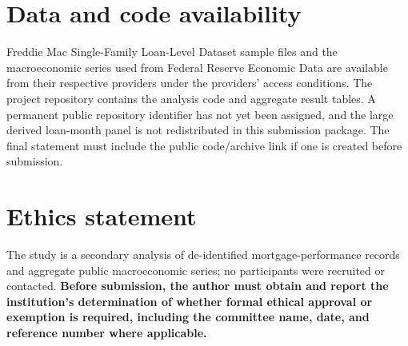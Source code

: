 \section*{Data and code availability}

Freddie Mac Single-Family Loan-Level Dataset sample files and the macroeconomic series used from Federal Reserve Economic Data are available from their respective providers under the providers' access conditions. The project repository contains the analysis code and aggregate result tables. A permanent public repository identifier has not yet been assigned, and the large derived loan-month panel is not redistributed in this submission package. The final statement must include the public code/archive link if one is created before submission.

\section*{Ethics statement}

The study is a secondary analysis of de-identified mortgage-performance records and aggregate public macroeconomic series; no participants were recruited or contacted. \textbf{Before submission, the author must obtain and report the institution's determination of whether formal ethical approval or exemption is required, including the committee name, date, and reference number where applicable.}
